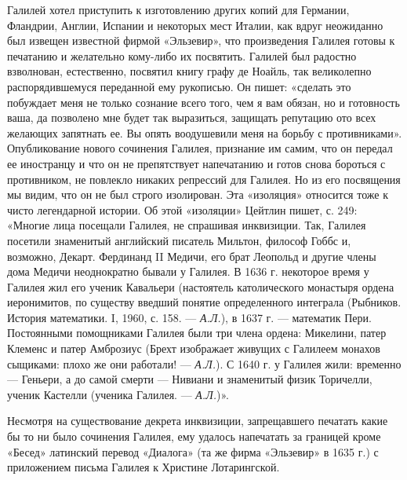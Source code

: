Галилей  хотел приступить  к изготовлению  других копий  для Германии,
Фландрии,  Англии,   Испании  и  некоторых  мест   Италии,  как  вдруг
неожиданно был  извещен известной фирмой «Эльзевир»,  что произведения
Галилея  готовы  к  печатанию  и желательно  кому-либо  их  посвятить.
Галилей был радостно взволнован,  естественно, посвятил книгу графу де
Ноайль, так великолепно распорядившемуся  переданной ему рукописью. Он
пишет: «сделать это побуждает меня  не только сознание всего того, чем
я  вам обязан,  но  и  готовность ваша,  да  позволено  мне будет  так
выразиться,  защищать репутацию  ото  всех желающих  запятнать ее.  Вы
опять воодушевили меня на борьбу с противниками». Опубликование нового
сочинения Галилея,  признание им самим,  что он передал  ее иностранцу
и  что  он  не  препятствует  напечатанию и  готов  снова  бороться  с
противником,  не повлекло  никаких репрессий  для Галилея.  Но из  его
посвящения мы видим,  что он не был строго  изолирован. Эта «изоляция»
относится  тоже  к  чисто  легендарной  истории.  Об  этой  «изоляции»
Цейтлин пишет,  с. 249:  «Многие лица  посещали Галилея,  не спрашивая
инквизиции.  Так,  Галилея  посетили  знаменитый  английский  писатель
Мильтон, философ Гоббс  и, возможно, Декарт. Фердинанд  II Медичи, его
брат  Леопольд  и  другие  члены дома  Медичи  неоднократно  бывали  у
Галилея. В 1636 г. некоторое время  у Галилея жил его ученик Кавальери
(настоятель  католического монастыря  ордена иеронимитов,  по существу
введший понятие определенного интеграла (Рыбников. История математики.
I,  1960, с.  158. ---  \emph{А.Л.}), в  1637 г.  --- математик  Пери.
Постоянными помощниками Галилея были три члена ордена: Микелини, патер
Клеменс и патер Амброзиус (Брехт изображает живущих с Галилеем монахов
сыщиками: плохо же они работали! --- \emph{А.Л.}). С 1640 г. у Галилея
жили: временно --- Геньери, а до самой смерти --- Нивиани и знаменитый
физик Торичелли, ученик Кастелли (ученика Галилея. --- \emph{А.Л.})».

Несмотря  на существование  декрета инквизиции,  запрещавшего печатать
какие  бы то  ни было  сочинения  Галилея, ему  удалось напечатать  за
границей  кроме  «Бесед»  латинский  перевод «Диалога»  (та  же  фирма
«Эльзевир»  в  1635  г.)  с  приложением  письма  Галилея  к  Христине
Лотарингской.

